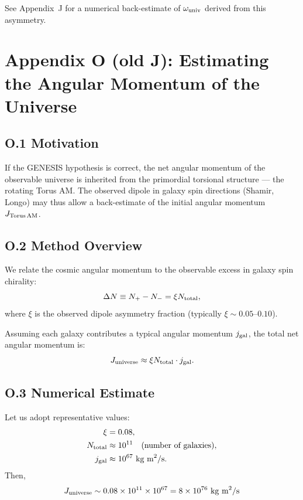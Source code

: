 \documentclass{article}
\begin{document}
\noindent See Appendix~J for a numerical back-estimate of $\omega_{\rm univ}$ derived from this asymmetry.




\section*{Appendix O (old J): Estimating the Angular Momentum of the Universe}
\label{app:universe-angular-momentum}


\subsection*{O.1 Motivation}
If the GENESIS hypothesis is correct, the net angular momentum of the observable universe is inherited from the primordial torsional structure --- the rotating Torus AM. The observed dipole in galaxy spin directions (Shamir, Longo) may thus allow a back-estimate of the initial angular momentum $J_{\rm Torus\,AM}$.

\subsection*{O.2 Method Overview}
We relate the cosmic angular momentum to the observable excess in galaxy spin chirality:
\begin{equation}
\Delta N \equiv N_+ - N_- = \xi N_{\rm total},
\end{equation}
where $\xi$ is the observed dipole asymmetry fraction (typically $\xi \sim 0.05$--$0.10$).

Assuming each galaxy contributes a typical angular momentum $j_{\rm gal}$, the total net angular momentum is:
\begin{equation}
J_{\rm universe} \approx \xi N_{\rm total} \cdot j_{\rm gal}.
\end{equation}

\subsection*{O.3 Numerical Estimate}
Let us adopt representative values:
\begin{align*}
\xi &= 0.08, \\
N_{\rm total} &\approx 10^{11} \quad \text{(number of galaxies)}, \\
j_{\rm gal} &\approx 10^{67}~\text{kg m}^2\text{/s}.
\end{align*}
Then,
\begin{equation}
J_{\rm universe} \sim 0.08 \times 10^{11} \times 10^{67} = 8 \times 10^{76}~\text{kg m}^2\text{/s}
\end{equation}
\end{document}

